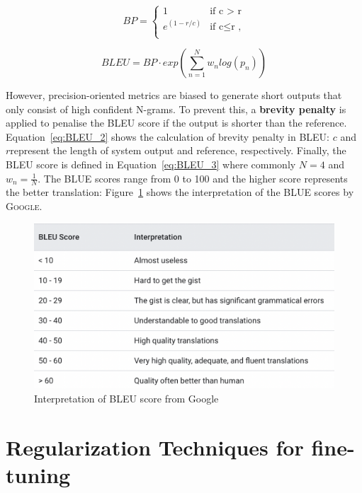 \begin{equation}
    BP = \begin{cases} 
      1 & \text{if c > r} \\
      e^{(1-r/c)} & \text{if c} \leq \text{r ,} \\
    \end{cases}
    \label{eq:BLEU_2}
\end{equation}

\begin{equation}
   BLEU = BP \cdot exp \left(\displaystyle\sum_{n=1}^{N}w_n log(p_n) \right)
    \label{eq:BLEU_3}
\end{equation}

However, precision-oriented metrics are biased to generate short outputs that only consist of high confident N-grams. To prevent this, a \textbf{brevity penalty} is applied to penalise the BLEU score if the output is shorter than the reference. Equation~\ref{eq:BLEU_2} shows the calculation of brevity penalty in BLEU: $c$ and $r$represent the length of system output and reference, respectively. Finally, the BLEU score is defined in Equation~\ref{eq:BLEU_3} where commonly $N = 4$ and $w_n = \frac{1}{N}$. The BLUE scores range from 0 to 100 and the higher score represents the better translation: Figure~\ref{fig:bleu_google} shows the interpretation of the BLUE scores by \textsc{Google}. 

\begin{figure}[h!]
    \centering
    \includegraphics[scale=0.5]{images/BLEU_google.png}
    \caption{Interpretation of BLEU score from Google~\protect\footnotemark}
    \label{fig:bleu_google}
\end{figure}

\section{Regularization Techniques for fine-tuning}\label{section:Regularization}%

